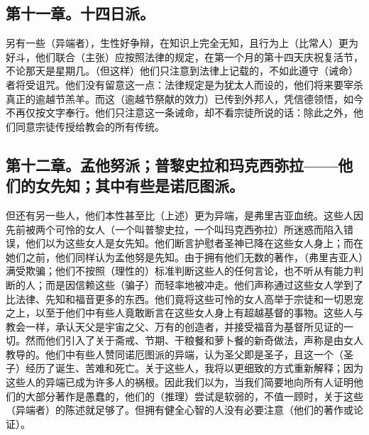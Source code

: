 
\subsection{第十一章。十四日派。}

另有一些（异端者），生性好争辩，在知识上完全无知，且行为上（比常人）更为好斗，他们联合（主张）应按照法律的规定，在第一个月的第十四天庆祝复活节，不论那天是星期几。（但这样）他们只注意到法律上记载的，不如此遵守（诫命）者将受诅咒。他们没有留意这一点：法律规定是为犹太人而设的，他们将来要宰杀真正的逾越节羔羊。而这（逾越节祭献的效力）已传到外邦人，凭信德领悟，如今不再仅按文字奉行。他们只注意这一条诫命，却不看宗徒所说的话：除此之外，他们同意宗徒传授给教会的所有传统。\par


\subsection{第十二章。孟他努派；普黎史拉和玛克西弥拉——他们的女先知；其中有些是诺厄图派。}

但还有另一些人，他们本性甚至比（上述）更为异端，是弗里吉亚血统。这些人因先前被两个可怜的女人（一个叫普黎史拉，一个叫玛克西弥拉）所迷惑而陷入错误，他们以为这些女人是女先知。他们断言护慰者圣神已降在这些女人身上；而在她们之前，他们同样认为孟他努是先知。由于拥有他们无数的著作，（弗里吉亚人）满受欺骗；他们不按照（理性的）标准判断这些人的任何言论，也不听从有能力判断的人；而是因信赖这些（骗子）而轻率地被冲走。他们声称通过这些女人学到了比法律、先知和福音更多的东西。他们竟将这些可怜的女人高举于宗徒和一切恩宠之上，以至于他们中有些人竟敢断言在这些女人身上有超越基督的事物。这些人与教会一样，承认天父是宇宙之父、万有的创造者，并接受福音为基督所见证的一切。然而他们引入了关于斋戒、节期、干粮餐和萝卜餐的新奇做法，声称是由女人教导的。他们中有些人赞同诺厄图派的异端，认为圣父即是圣子，且这一个（圣子）经历了诞生、苦难和死亡。关于这些人，我将以更细致的方式重新解释；因为这些人的异端已成为许多人的祸根。因此我们以为，当我们简要地向所有人证明他们的大部分著作是愚蠢的，他们的（推理）尝试是软弱的，不值一顾时，关于这些（异端者）的陈述就足够了。但拥有健全心智的人没有必要注意（他们的著作或论证）。\par


